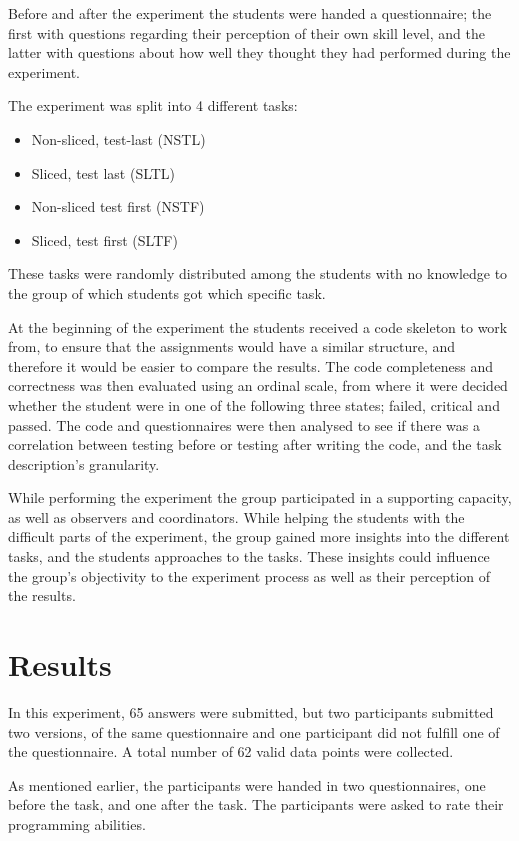 \documentclass{sig-alternate-05-2015}
\begin{document}
Before and after the experiment the students were handed a questionnaire; the first with questions regarding their perception of their own skill level, and the latter with questions about how well they thought they had performed during the experiment.


The experiment was split into 4 different tasks:
\begin{itemize}
	\item Non-sliced, test-last (NSTL)
	\item Sliced, test last (SLTL)
	\item Non-sliced test first (NSTF)
	\item Sliced, test first (SLTF)
\end{itemize}

These tasks were randomly distributed among the students with no knowledge to the group of which students got which specific task.


At the beginning of the experiment the students received a code skeleton to work from, to ensure that the assignments would have a similar structure, and therefore it would be easier to compare the results. The code completeness and correctness was then evaluated using an ordinal scale, from where it were decided whether the student were in one of the following three states; failed, critical and passed. The code and questionnaires were then analysed to see if there was a correlation between testing before or testing after writing the code, and the task description's granularity.


While performing the experiment the group participated in a supporting capacity, as well as observers and coordinators. While helping the students with the difficult parts of the experiment, the group gained more insights into the different tasks, and the students approaches to the tasks. These insights could influence the group's objectivity to the experiment process as well as their perception of the results.

\section{Results}
In this experiment, 65 answers were submitted, but two participants submitted two versions, of the same questionnaire and one participant did not fulfill one of the questionnaire. A total number of 62 valid data points were collected.


As mentioned earlier, the participants were handed in two questionnaires, one before the task, and one after the task. The participants were asked to rate their programming abilities.
\end{document}
